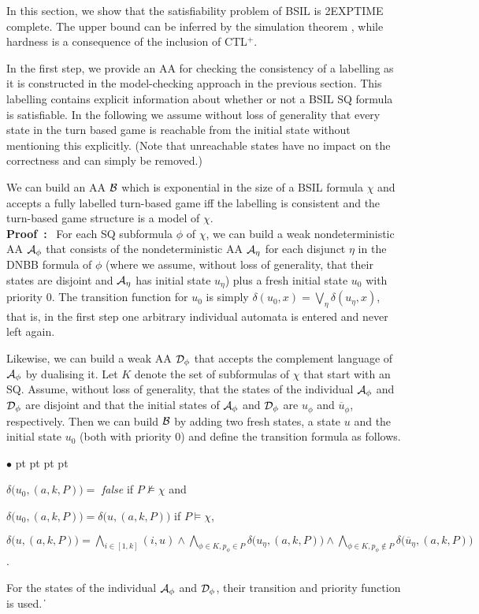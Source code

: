 \documentclass[11pt]{article}
\newcommand{\cala}{{\cal A}}
\newcommand{\calb}{{\cal B}}
\newcommand{\cald}{{\cal D}}
\newcommand{\pf}{\noindent\mbox{\bf Proof : }}
\def\qed{\ifmmode\|\else{\unskip\nobreak\hfil
\penalty50\hskip1em\null\nobreak\hfil$\blacksquare$
\parfillskip=0pt\finalhyphendemerits=0\endgraf}\fi}
\newenvironment{list1}{\begin{list}{$\bullet$}
{\topsep 0 pt \parsep 0 pt \partopsep 0 pt \itemsep 0 pt}}{\end{list}}
\begin{document}
In this section, we show that the satisfiability problem of BSIL is 2EXPTIME complete.
The upper bound can be inferred by the simulation theorem \cite{}, while hardness is a consequence of the inclusion of CTL${}^+$.

In the first step, 
we provide an AA for checking the consistency of a labelling 
as it is constructed in the model-checking approach in the previous section.
This labelling contains explicit information about whether 
or not a BSIL SQ formula is satisfiable.
In the following we assume without loss of generality 
that every state in the turn based game is reachable from 
the initial state without mentioning this explicitly.
(Note that unreachable states have no impact on the correctness 
and can simply be removed.)



{\lemma\label{lemma.sat.B}
We can build an AA $\calb$ 
which is exponential in the size of a BSIL formula $\chi$ 
and accepts a fully labelled turn-based game 
iff the labelling is consistent and the turn-based game structure 
is a model of $\chi$.
}
\\\pf 
For each SQ subformula $\phi$ of $\chi$, 
we can build a weak nondeterministic AA 
$\cala_\phi$ that consists of the nondeterministic AA 
$\cala_\eta$ for each disjunct $\eta$ in the DNBB formula of $\phi$ 
(where we assume, without loss of generality, 
that their states are disjoint and 
$\cala_\eta$ has initial state $u_\eta$) 
plus a fresh initial state $u_0$ with priority $0$.
The transition function for $u_0$ is simply
$\delta(u_0,x) = \bigvee_{\eta} \delta(u_\eta,x)$, 
that is, in the first step one arbitrary individual automata 
is entered and never left again.

Likewise, we can build a weak AA $\cald_\phi$ 
that accepts the complement language of $\cala_\phi$ 
by dualising it.  
Let $K$ denote the set of subformulas of $\chi$ that start with an SQ.
Assume, without loss of generality, 
that the states of the individual $\cala_\phi$ and $\cald_\phi$ 
are disjoint and 
that the initial states of $\cala_\phi$ and $\cald_\phi$ are $u_\phi$ 
and $\overline{u}_\phi$, respectively.
Then we can build $\calb$ by adding two fresh states, a state $u$ 
and the initial state $u_0$ (both with priority 0) and define 
the transition formula as follows. 
\begin{list1}
\item $\delta\big(u_0,(a,k,P)\big) =$ \emph{false} if $P\not\models \chi$ 
  and  
\item $\delta\big(u_0,(a,k,P)\big) = \delta\big(u,(a,k,P)\big)$ 
  if $P\models \chi$,
\item $\delta\big(u,(a,k,P)\big) = \bigwedge\limits_{i\in[1,k]}(i,u) 
  \wedge \bigwedge_{\phi\in K,p_\phi\in P} \delta\big(u_\eta,(a,k,P)\big) 
  \wedge \bigwedge_{\phi\in K,p_\phi\notin P} 
    \delta\big(\overline{u}_\eta,(a,k,P)\big)$.
\end{list1}
For the states of the individual $\cala_\phi$ and $\cald_\phi$, their transition and priority function is used.
\qed 
\end{document}
